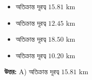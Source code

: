 \documentclass[12pt, a4paper]{article}
\begin{document}
\begin{itemize}[label={}, leftmargin=1cm, itemsep=0.5em]
    \item[\textbf{A)}] অতিক্রান্ত দূরত্ব $15.81\text{ km}$
    \item[\textbf{B)}] অতিক্রান্ত দূরত্ব $12.45\text{ km}$
    \item[\textbf{C)}] অতিক্রান্ত দূরত্ব $18.50\text{ km}$
    \item[\textbf{D)}] অতিক্রান্ত দূরত্ব $10.20\text{ km}$
\end{itemize}

\vspace{0.5em}
\begin{tcolorbox}[answerbox]
    \textbf{\color{success} উত্তর:} A) অতিক্রান্ত দূরত্ব $15.81\text{ km}$
\end{tcolorbox}
\vspace{1em}
\end{document}
